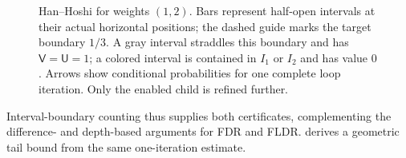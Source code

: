 \begin{figure}[tbp]
 \caption{Han--Hoshi for weights $(1,2)$.  Bars represent half-open
 intervals at their actual horizontal positions; the dashed guide marks
 the target boundary $1/3$.  A gray interval straddles this boundary and
 has $\mathsf V=\mathsf U=1$; a colored interval is contained in $I_1$ or
 $I_2$ and has value $0$.  Arrows show conditional probabilities for one
 complete loop iteration.  Only the enabled child is refined further.}
 \label{fig:han-hoshi-certificates}
\end{figure}


Interval-boundary counting thus supplies both certificates, complementing
the difference- and depth-based arguments for FDR and FLDR.
 derives a geometric tail bound from the same
one-iteration estimate.
